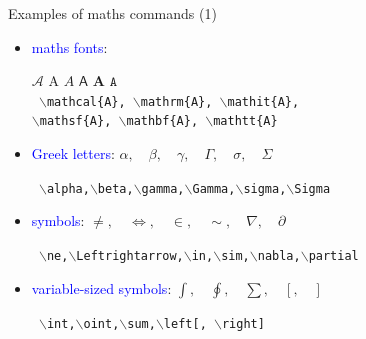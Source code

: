 \documentclass{beamer}
\newcommand{\bc}{\begin{center}}
\newcommand{\ec}{\end{center}}
\newcommand{\bs}{$\backslash$}
\def\mynormal{\vspace*{-0.5cm}}
\begin{document}
\begin{frame}{Examples of maths commands (1)}
\mynormal
\begin{itemize}
\item \textcolor{blue}{maths fonts}:
\bc
$\mathcal{A}$\qquad
$\mathrm{A}$\qquad
$\mathit{A}$\qquad
$\mathsf{A}$\qquad
$\mathbf{A}$\qquad
$\mathtt{A}$\\
{\tt
{\bs mathcal\{A\}},
{\bs mathrm\{A\}},
{\bs mathit\{A\}},\\
{\bs mathsf\{A\}},
{\bs mathbf\{A\}},
{\bs mathtt\{A\}}}
\ec
\pause
\medskip
\item \textcolor{blue}{Greek letters}:\qquad
$\alpha,\quad\beta, \quad \gamma, \quad\Gamma, \quad\sigma, \quad\Sigma$
\bc
{\tt
\bs alpha,\bs beta,\bs gamma,\bs Gamma,\bs sigma,\bs Sigma
}
\ec
\pause
\medskip
\item \textcolor{blue}{symbols}:\qquad
$\ne,\quad\Leftrightarrow,\quad\in ,\quad\sim,\quad\nabla,\quad\partial$
\bc
{\tt
\bs ne,\bs Leftrightarrow,\bs in,\bs sim,\bs nabla,\bs partial
}
\ec
\pause
\medskip
\item \textcolor{blue}{variable-sized symbols}:\qquad
$\int,\quad\oint,\quad\sum,\quad\left[,\quad\right]$
\bc
{\tt 
\bs int,\quad\bs oint,\quad\bs sum,\quad\bs left[, \quad\bs right]}
\ec
\end{itemize}
\end{frame}
\end{document}
